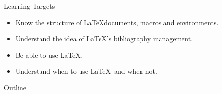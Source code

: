 
\begin{frame}{Learning Targets}
  \begin{itemize}
    \item Know the structure of \LaTeX documents, macros and environments.
    \item Understand the idea of \LaTeX's bibliography management.
    \item Be able to use \LaTeX.
    \item Understand when to use \LaTeX\ and when not.
  \end{itemize}
\end{frame}

\begin{frame}{Outline}
  \tableofcontents
\end{frame}

